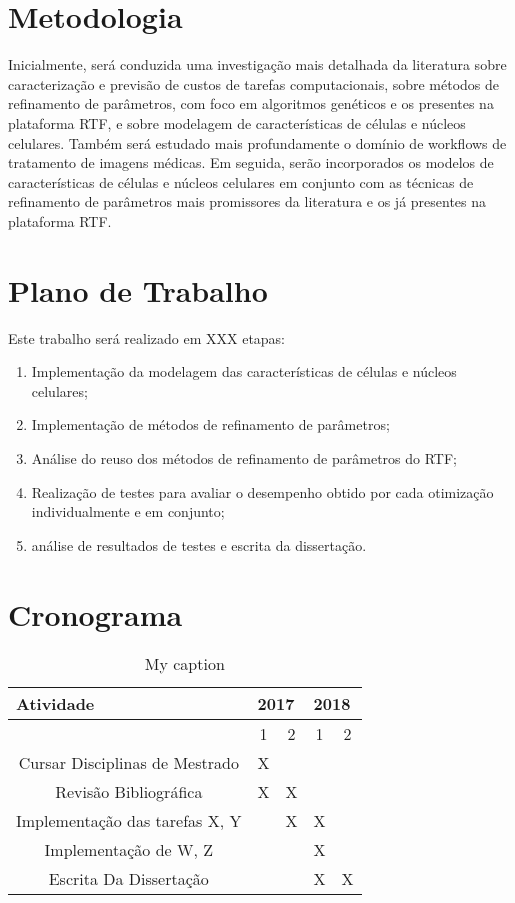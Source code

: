 \documentclass[a4paper,10pt]{article}
\begin{document}
\section{Metodologia}
Inicialmente, será conduzida uma investigação mais detalhada da literatura sobre caracterização e previsão de custos de tarefas computacionais, sobre métodos de refinamento de parâmetros, com foco em algoritmos genéticos e os presentes na plataforma RTF, e sobre modelagem de características de células e núcleos celulares. Também será estudado mais profundamente o domínio de workflows de tratamento de imagens médicas. Em seguida, serão incorporados os modelos de características de células e núcleos celulares em conjunto com as técnicas de refinamento de parâmetros mais promissores da literatura e os já presentes na plataforma RTF.

\section{Plano de Trabalho}

Este trabalho será realizado em XXX etapas:
\begin{enumerate}
	\item Implementação da modelagem das características de células e núcleos celulares;
	\item Implementação de métodos de refinamento de parâmetros;
	\item Análise do reuso dos métodos de refinamento de parâmetros do RTF;
	\item Realização de testes para avaliar o desempenho obtido por cada otimização individualmente e em conjunto;
	\item análise de resultados de testes e escrita da dissertação.
\end{enumerate}


\section{Cronograma}
\begin{table}[]
	\centering
	\caption{My caption}
	\label{my-label}
	\begin{tabular}{|c|c|c|c|c|}
		\hline
		\multicolumn{1}{|l|}{Atividade} & \multicolumn{2}{l|}{2017} & \multicolumn{2}{l|}{2018} \\ \hline
		& 1\degree    & 2\degree    & 1\degree    & 2\degree    \\ \hline
		Cursar Disciplinas de Mestrado  & X           &             &             &             \\ \hline
		Revisão Bibliográfica           & X           & X           &             &             \\ \hline
		Implementação das tarefas X, Y  &             & X           & X           &             \\ \hline
		Implementação de W, Z     &             &             & X           &             \\ \hline
		Escrita Da Dissertação          &             &             & X           & X           \\ \hline
	\end{tabular}
\end{table}



	
	
	
\end{document}
